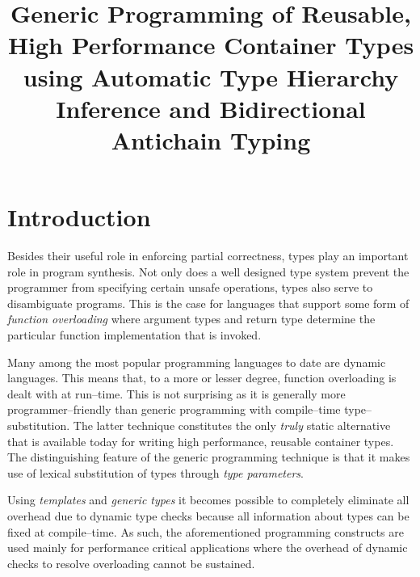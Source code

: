 \documentclass{sigplanconf}
\title{Generic Programming of Reusable, High Performance Container
  Types using Automatic Type Hierarchy Inference and Bidirectional
  Antichain Typing}
\newcommand{\concept}[1]{\emph{#1}}
\begin{document}
\maketitle


\section{Introduction}

Besides their useful role in enforcing partial correctness, types play
an important role in program synthesis. Not only does a well designed
type system prevent the programmer from specifying certain unsafe
operations, types also serve to disambiguate programs.  This is the
case for languages that support some form of \concept{function
  overloading} where argument types and return type determine the
particular function implementation that is invoked.

Many among the most popular programming languages to date are dynamic
languages. This means that, to a more or lesser degree, function
overloading is dealt with at run--time. This is not surprising as it
is generally more programmer--friendly than generic programming with
compile--time type--substitution. The latter technique constitutes the
only \emph{truly} static alternative that is available today for
writing high performance, reusable container types. The distinguishing
feature of the generic programming technique is that it makes use of
lexical substitution of types through \emph{type parameters}.

Using \emph{templates} and \emph{generic types} it becomes possible to
completely eliminate all overhead due to dynamic type checks because
all information about types can be fixed at compile--time. As such,
the aforementioned programming constructs are used mainly for
performance critical applications where the overhead of dynamic checks
to resolve overloading cannot be sustained.
\end{document}
